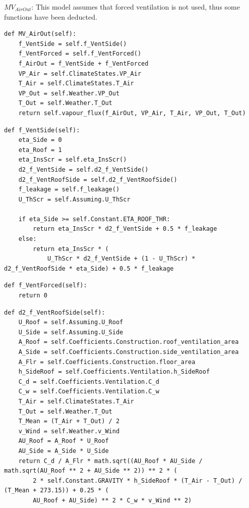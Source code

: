 \documentclass[a4paper]{article}
\begin{document}
\(MV_{AirOut}\):
This model assumes that forced ventilation is not used, thus some functions have been deducted.
\begin{mdframed}[leftline=false,rightline=false,backgroundcolor=magenta!10,nobreak=true]
  \begin{verbatim}
def MV_AirOut(self):
    f_VentSide = self.f_VentSide()
    f_VentForced = self.f_VentForced()
    f_AirOut = f_VentSide + f_VentForced
    VP_Air = self.ClimateStates.VP_Air
    T_Air = self.ClimateStates.T_Air
    VP_Out = self.Weather.VP_Out
    T_Out = self.Weather.T_Out
    return self.vapour_flux(f_AirOut, VP_Air, T_Air, VP_Out, T_Out)
  \end{verbatim}
\end{mdframed}
\begin{mdframed}[leftline=false,rightline=false,backgroundcolor=magenta!10,nobreak=true]
  \begin{verbatim}
def f_VentSide(self):
    eta_Side = 0
    eta_Roof = 1
    eta_InsScr = self.eta_InsScr()
    d2_f_VentSide = self.d2_f_VentSide()
    d2_f_VentRoofSide = self.d2_f_VentRoofSide()
    f_leakage = self.f_leakage()
    U_ThScr = self.Assuming.U_ThScr

    if eta_Side >= self.Constant.ETA_ROOF_THR:
        return eta_InsScr * d2_f_VentSide + 0.5 * f_leakage
    else:
        return eta_InsScr * (
            U_ThScr * d2_f_VentSide + (1 - U_ThScr) * d2_f_VentRoofSide * eta_Side) + 0.5 * f_leakage
  \end{verbatim}
\end{mdframed}
\begin{mdframed}[leftline=false,rightline=false,backgroundcolor=magenta!10,nobreak=true]
  \begin{verbatim}
def f_VentForced(self):
    return 0
  \end{verbatim}
\end{mdframed}
\begin{mdframed}[leftline=false,rightline=false,backgroundcolor=magenta!10,nobreak=true]
  \begin{verbatim}
def d2_f_VentRoofSide(self):
    U_Roof = self.Assuming.U_Roof
    U_Side = self.Assuming.U_Side
    A_Roof = self.Coefficients.Construction.roof_ventilation_area
    A_Side = self.Coefficients.Construction.side_ventilation_area
    A_Flr = self.Coefficients.Construction.floor_area
    h_SideRoof = self.Coefficients.Ventilation.h_SideRoof
    C_d = self.Coefficients.Ventilation.C_d
    C_w = self.Coefficients.Ventilation.C_w
    T_Air = self.ClimateStates.T_Air
    T_Out = self.Weather.T_Out
    T_Mean = (T_Air + T_Out) / 2
    v_Wind = self.Weather.v_Wind
    AU_Roof = A_Roof * U_Roof
    AU_Side = A_Side * U_Side
    return C_d / A_Flr * math.sqrt((AU_Roof * AU_Side / math.sqrt(AU_Roof ** 2 + AU_Side ** 2)) ** 2 * (
        2 * self.Constant.GRAVITY * h_SideRoof * (T_Air - T_Out) / (T_Mean + 273.15)) + 0.25 * (
        AU_Roof + AU_Side) ** 2 * C_w * v_Wind ** 2)
  \end{verbatim}
\end{mdframed}
\end{document}
